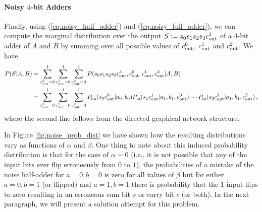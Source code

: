\paragraph{Noisy $4$-bit Adders} Finally, using (\ref{eq:noisy_half_adder}) and (\ref{eq:noisy_full_adder}), we can compute the marginal distribution over the output $S:=s_0s_1s_2s_3c_{\mathrm{out}}^3$ of a $4$-bit adder of $A$ and $B$ by summing over all possible values of $c_{\mathrm{out}}^0$, $c_{\mathrm{out}}^1$ and $c_{\mathrm{out}}^2$. We have 
\begin{align}
    P(S|A,B) & = \sum_{c_{\mathrm{out}}^0=0}^1 \sum_{c_{\mathrm{out}}^1=0}^1 \sum_{c_{\mathrm{out}}^2=0}^1 P(s_0s_1s_2s_3c_{\mathrm{out}}^3,c_{\mathrm{out}}^0,c_{\mathrm{out}}^1,c_{\mathrm{out}}^2|A,B) \\
    & = \sum_{c_{\mathrm{out}}^0=0}^1 \sum_{c_{\mathrm{out}}^1=0}^1 \sum_{c_{\mathrm{out}}^2=0}^1 P_{\mathrm{ha}}(s_0c_{\mathrm{out}}^0|a_0,b_0)P_{\mathrm{fa}}(s_1c_{\mathrm{out}}^1|a_1,b_1,c_{\mathrm{out}}^0)\cdots P_{\mathrm{fa}}(s_3c_{\mathrm{out}}^3|a_1,b_1,c_{\mathrm{out}}^2)  \,,
\end{align}
where the second line follows from the directed graphical network structure.

In Figure \ref{fig:noise_prob_dist} we have shown how the resulting distributions vary as functions of $\alpha$ and $\beta$. One thing to note about this induced probability distribution is that for the case of $\alpha=0$ (i.e., it is not possible that any of the input bits ever flip erroneously from $0$ to $1$), the probabilities of a mistake of the noise half-adder for $a=0, b=0$ is zero for all values of $\beta$ but for either $a=0, b=1$ (or flipped) and $a=1, b=1$ there is probability that the $1$ input flips to zero resulting in an erroneous sum bit $s$ or carry bit $c$ (or both). In the next paragraph, we will present a solution attempt for this problem.






